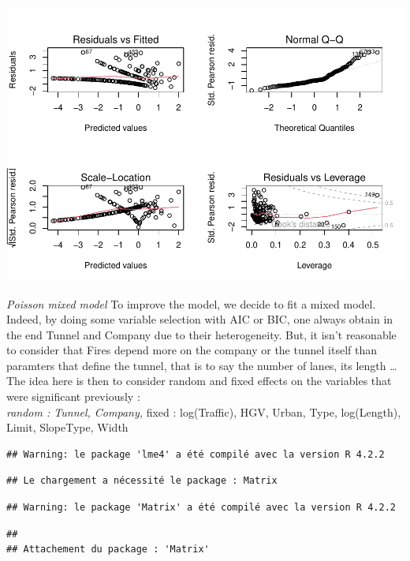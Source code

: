\documentclass[
]{article}
\begin{document}
\includegraphics{Report_files/figure-latex/better model-1.pdf}

\emph{Poisson mixed model} To improve the model, we decide to fit a
mixed model. Indeed, by doing some variable selection with AIC or BIC,
one always obtain in the end Tunnel and Company due to their
heterogeneity. But, it isn't reasonable to consider that Fires depend
more on the company or the tunnel itself than paramters that define the
tunnel, that is to say the number of lanes, its length \ldots{}\\
The idea here is then to consider random and fixed effects on the
variables that were significant previously :\\
\emph{random : Tunnel, Company, }fixed : log(Traffic), HGV, Urban, Type,
log(Length), Limit, SlopeType, Width\\

\begin{verbatim}
## Warning: le package 'lme4' a été compilé avec la version R 4.2.2
\end{verbatim}

\begin{verbatim}
## Le chargement a nécessité le package : Matrix
\end{verbatim}

\begin{verbatim}
## Warning: le package 'Matrix' a été compilé avec la version R 4.2.2
\end{verbatim}

\begin{verbatim}
## 
## Attachement du package : 'Matrix'
\end{verbatim}
\end{document}

